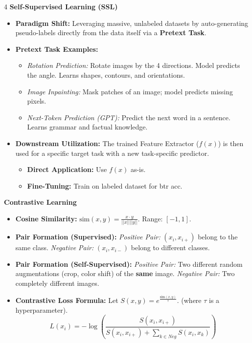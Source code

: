 \documentclass[8pt,landscape,a4paper]{extarticle}
\begin{document}
\begin{multicols*}{4}
\vspace{1mm}
\noindent\textbf{Self-Supervised Learning (SSL)}
\begin{itemize}[leftmargin=*, nosep]
    \item \textbf{Paradigm Shift:} Leveraging massive, unlabeled datasets by auto-generating pseudo-labels directly from the data itself via a \textbf{Pretext Task}.
    \item \textbf{Pretext Task Examples:} 
    \begin{itemize}[leftmargin=*, nosep]
        \item \textit{Rotation Prediction:} Rotate images by the 4 directions. Model predicts the angle. Learns shapes, contours, and orientations.
        \item \textit{Image Inpainting:} Mask patches of an image; model predicts missing pixels.
        \item \textit{Next-Token Prediction (GPT):} Predict the next word in a sentence. Learns grammar and factual knowledge.
    \end{itemize}
    \item \textbf{Downstream Utilization:} The trained Feature Extractor ($f(x)$) is then used for a specific target task with a new task-specific predictor.
    \begin{itemize}[leftmargin=*, nosep]
    \item \textbf{Direct Application:} Use $f(x)$ as-is. 
    \item \textbf{Fine-Tuning:} Train on labeled dataset for btr acc.
    \end{itemize}
\end{itemize}

\vspace{1mm}
\noindent\textbf{Contrastive Learning}
\begin{itemize}[leftmargin=*, nosep]
    \item {\footnotesize  \textbf{Cosine Similarity:} $\text{sim}(x, y) = \frac{x \cdot y}{||x|| ||y||}$.  Range: $[-1, 1]$.}
    \item \textbf{Pair Formation (Supervised):} \textit{Positive Pair:} $(x_i, x_{i+})$ belong to the same class. \textit{Negative Pair:} $(x_i, x_{i-})$ belong to different classes.
    \item \textbf{Pair Formation (Self-Supervised):} \textit{Positive Pair:} Two different random augmentations (crop, color shift) of the \textbf{same} image. \textit{Negative Pair:} Two completely different images.
    \item \textbf{Contrastive Loss Formula:} Let $S(x, y) = e^{\frac{\text{sim}(x,y) }{\tau}}$. (where $\tau$ is a hyperparameter).
    $$L(x_i) = -\log \left( \frac{S(x_i, x_{i+})}{S(x_i, x_{i+}) + \sum_{k \in Neg} S(x_i, x_k)} \right)$$
\end{itemize}

\end{multicols*}
\end{document}
